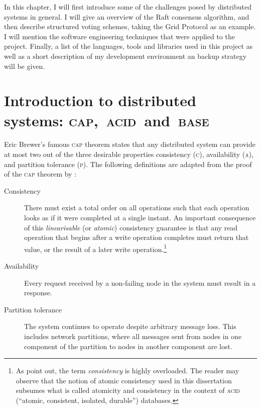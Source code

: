 \documentclass[12pt,chapterprefix=true,toc=bibliography,numbers=noendperiod,
               footnotes=multiple,twoside]{scrreprt}
\begin{document}
In this chapter, I will first introduce some of the challenges posed by distributed systems in general. I will give an overview of the Raft consensus algorithm, and then describe structured voting schemes, taking the Grid Protocol as an example. I will mention the software engineering techniques that were applied to the project. Finally, a list of the languages, tools and libraries used in this project as well as a short description of my development environment an backup strategy will be given.


\section[Introduction to distributed systems]{Introduction to distributed systems: \textsc{cap},~\textsc{acid}~and~\textsc{base}}
\label{ssc:cap-acid-and-base}

Eric Brewer's famous \textsc{cap} theorem states that any distributed system can provide at most two out of the three desirable properties consistency (\textsc{c}), availability (\textsc{a}), and partition tolerance (\textsc{p}).\autocite{cap} The following definitions are adapted from the proof of the \textsc{cap} theorem by \citeauthor{capproof}:\autocite{capproof}

\begin{description}
    \item[Consistency] There must exist a total order on all operations such that each operation looks as if it were completed at a single instant. An important consequence of this \emph{linearisable} (or \emph{atomic}) consistency guarantee is that any read operation that begins after a write operation completes must return that value, or the result of a later write operation.\footnote{As \textcite{capproof} point out, the term \emph{consistency} is highly overloaded. The reader may observe that the notion of atomic consistency used in this dissertation subsumes what is called atomicity and consistency in the context of \textsc{acid} (\enquote{atomic, consistent, isolated, durable}) databases.}
    \item[Availability] Every request received by a non-failing node in the system must result in a response.
    \item[Partition tolerance] The system continues to operate despite arbitrary message loss. This includes network partitions, where all messages sent from nodes in one component of the partition to nodes in another component are lost.
\end{description}
\end{document}
